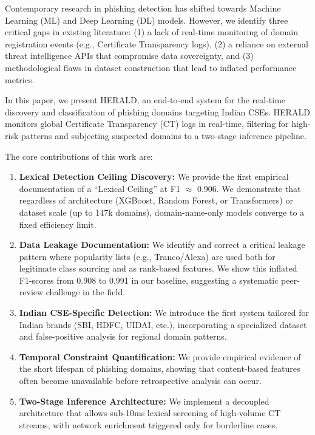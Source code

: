 \documentclass[journal]{IEEEtran}
\begin{document}
Contemporary research in phishing detection has shifted towards Machine Learning (ML) and Deep Learning (DL) models. However, we identify three critical gaps in existing literature: (1) a lack of real-time monitoring of domain registration events (e.g., Certificate Transparency logs), (2) a reliance on external threat intelligence APIs that compromise data sovereignty, and (3) methodological flaws in dataset construction that lead to inflated performance metrics.

In this paper, we present HERALD, an end-to-end system for the real-time discovery and classification of phishing domains targeting Indian CSEs. HERALD monitors global Certificate Transparency (CT) logs in real-time, filtering for high-risk patterns and subjecting suspected domains to a two-stage inference pipeline. 

The core contributions of this work are:
\begin{enumerate}
    \item \textbf{Lexical Detection Ceiling Discovery:} We provide the first empirical documentation of a ``Lexical Ceiling'' at F1 $\approx$ 0.906. We demonstrate that regardless of architecture (XGBoost, Random Forest, or Transformers) or dataset scale (up to 147k domains), domain-name-only models converge to a fixed efficiency limit.
    \item \textbf{Data Leakage Documentation:} We identify and correct a critical leakage pattern where popularity lists (e.g., Tranco/Alexa) are used both for legitimate class sourcing and as rank-based features. We show this inflated F1-scores from 0.908 to 0.991 in our baseline, suggesting a systematic peer-review challenge in the field.
    \item \textbf{Indian CSE-Specific Detection:} We introduce the first system tailored for Indian brands (SBI, HDFC, UIDAI, etc.), incorporating a specialized dataset and false-positive analysis for regional domain patterns.
    \item \textbf{Temporal Constraint Quantification:} We provide empirical evidence of the short lifespan of phishing domains, showing that content-based features often become unavailable before retrospective analysis can occur.
    \item \textbf{Two-Stage Inference Architecture:} We implement a decoupled architecture that allows sub-10ms lexical screening of high-volume CT streams, with network enrichment triggered only for borderline cases.
\end{enumerate}
\end{document}
